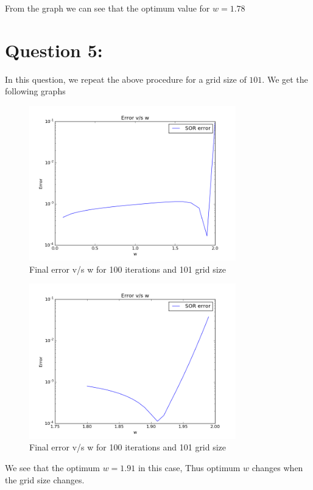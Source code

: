 \documentclass[11pt, a4paper]{article}
\begin{document}
From the graph we can see that the optimum value for $w=1.78$


\section{Question 5:}
\label{Question5}
In this question, we repeat the above procedure for a grid size of $101$. We get the following graphs
\begin{figure}[H]
 \centering
 \includegraphics[width = 0.8\textwidth]{nmax_100_N_101.png}
 \caption{Final error v/s w for 100 iterations and 101 grid size}
\end{figure}
\begin{figure}[H]
 \centering
 \includegraphics[width = 0.8\textwidth]{nmax_100_N_101_2.png}
 \caption{Final error v/s w for 100 iterations and 101 grid size}
\end{figure}

We see that the optimum $w = 1.91$ in this case, Thus optimum $w$ changes when the grid size changes.
\end{document}
